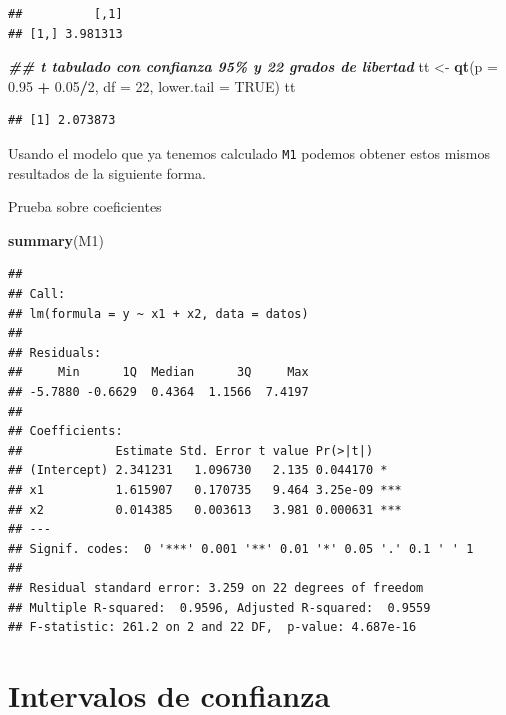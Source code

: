 \documentclass[
]{book}
\newenvironment{Shaded}{\begin{snugshade}}{\end{snugshade}}
\newcommand{\AttributeTok}[1]{\textcolor[rgb]{0.13,0.29,0.53}{#1}}
\newcommand{\ConstantTok}[1]{\textcolor[rgb]{0.56,0.35,0.01}{#1}}
\newcommand{\DecValTok}[1]{\textcolor[rgb]{0.00,0.00,0.81}{#1}}
\newcommand{\DocumentationTok}[1]{\textcolor[rgb]{0.56,0.35,0.01}{\textbf{\textit{#1}}}}
\newcommand{\FloatTok}[1]{\textcolor[rgb]{0.00,0.00,0.81}{#1}}
\newcommand{\FunctionTok}[1]{\textcolor[rgb]{0.13,0.29,0.53}{\textbf{#1}}}
\newcommand{\NormalTok}[1]{#1}
\newcommand{\OtherTok}[1]{\textcolor[rgb]{0.56,0.35,0.01}{#1}}
\newcommand{\SpecialCharTok}[1]{\textcolor[rgb]{0.81,0.36,0.00}{\textbf{#1}}}
\begin{document}
\begin{verbatim}
##          [,1]
## [1,] 3.981313
\end{verbatim}

\begin{Shaded}
\begin{Highlighting}[]
\DocumentationTok{\#\# t tabulado con confianza 95\% y 22 grados de libertad}
\NormalTok{tt }\OtherTok{\textless{}{-}} \FunctionTok{qt}\NormalTok{(}\AttributeTok{p =} \FloatTok{0.95} \SpecialCharTok{+} \FloatTok{0.05}\SpecialCharTok{/}\DecValTok{2}\NormalTok{, }\AttributeTok{df =} \DecValTok{22}\NormalTok{, }\AttributeTok{lower.tail =} \ConstantTok{TRUE}\NormalTok{)}
\NormalTok{tt}
\end{Highlighting}
\end{Shaded}

\begin{verbatim}
## [1] 2.073873
\end{verbatim}

Usando el modelo que ya tenemos calculado \texttt{M1} podemos obtener estos mismos resultados de la siguiente forma.

Prueba sobre coeficientes

\begin{Shaded}
\begin{Highlighting}[]
\FunctionTok{summary}\NormalTok{(M1)}
\end{Highlighting}
\end{Shaded}

\begin{verbatim}
## 
## Call:
## lm(formula = y ~ x1 + x2, data = datos)
## 
## Residuals:
##     Min      1Q  Median      3Q     Max 
## -5.7880 -0.6629  0.4364  1.1566  7.4197 
## 
## Coefficients:
##             Estimate Std. Error t value Pr(>|t|)    
## (Intercept) 2.341231   1.096730   2.135 0.044170 *  
## x1          1.615907   0.170735   9.464 3.25e-09 ***
## x2          0.014385   0.003613   3.981 0.000631 ***
## ---
## Signif. codes:  0 '***' 0.001 '**' 0.01 '*' 0.05 '.' 0.1 ' ' 1
## 
## Residual standard error: 3.259 on 22 degrees of freedom
## Multiple R-squared:  0.9596, Adjusted R-squared:  0.9559 
## F-statistic: 261.2 on 2 and 22 DF,  p-value: 4.687e-16
\end{verbatim}

\section{Intervalos de confianza}\label{intervalos-de-confianza}
\end{document}
